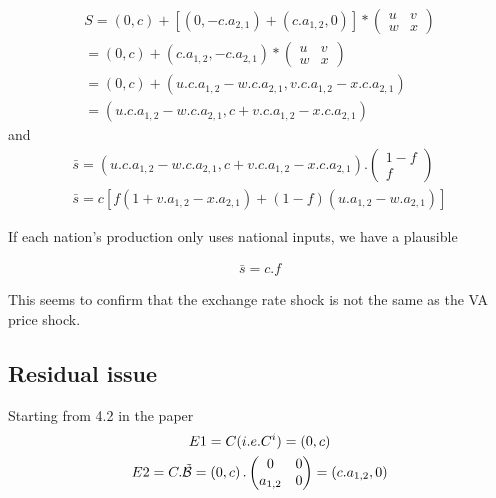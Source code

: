 \documentclass[11pt,a4paper]{article}
\begin{document}
\begin{gather*}
S =\left(0,c\right)+\left[\left(0,-c.a_{2,1}\right)+\left(c.a_{1,2},0\right)\right]*\left(\begin{matrix}u&v\\w&x\end{matrix}\right)
\\
=\left(0,c\right)+\left(c.a_{1,2},-c.a_{2,1}\right)*\left(\begin{matrix}u&v\\w&x\end{matrix}\right)
\\
=\left(0,c\right)+\left(u.c.a_{1,2}-w.c.a_{2,1},v.c.a_{1,2}-x.c.a_{2,1}\right)
\\
=\left(u.c.a_{1,2}-w.c.a_{2,1},c+v.c.a_{1,2}-x.c.a_{2,1}\right)
\end{gather*}
and
\begin{gather*}
\bar{s}=\left(u.c.a_{1,2}-w.c.a_{2,1},c+v.c.a_{1,2}-x.c.a_{2,1}\right).\left(\begin{matrix}1-f\\f\end{matrix}\right)
\\
\bar{s}=c\left[f\left(1+v.a_{1,2}-x.a_{2,1}\right)+\left(1-f\right)\left(u.a_{1,2}-w.a_{2,1}\right)\right]
\end{gather*}


If each nation's production only uses national inputs, we have a plausible

\begin{gather*}
\bar{s}=c.f
\end{gather*}

This seems to confirm that the exchange rate shock is not the same as the VA price shock.

\subsection{Residual issue}

Starting from 4.2 in the paper
\begin{gather*}
E1=C (i.e. C^i)=\left(0,c\right)
\\
E2=C.\tilde{\cal B}=\left(0,c\right).\left(\begin{matrix}0&0\\a_{1,2}&0\end{matrix}\right)=\left(c.a_{1,2},0\right)
\end{gather*}
\end{document}
